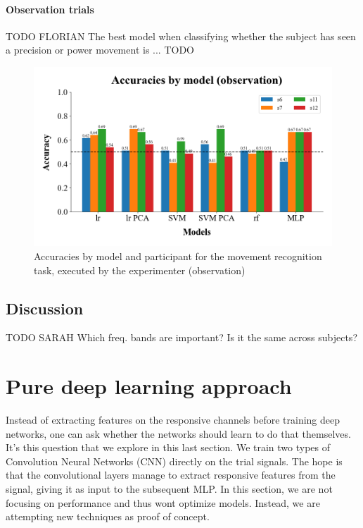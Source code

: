 \documentclass[10pt,conference,compsocconf]{IEEEtran}
\begin{document}
\paragraph{Observation trials}
TODO FLORIAN
The best model when classifying whether the subject has seen a precision or power movement is ... TODO

\begin{figure}[h!]
  \center
  \includegraphics[width=\linewidth]{../figures/accuracies_across_part_obs.png}
  \caption{Accuracies by model and participant for the movement recognition task, executed by the experimenter (observation)}
\end{figure}
\FloatBarrier

\subsection{Discussion}
TODO SARAH
Which freq. bands are important? Is it the same across subjects?

\section{Pure deep learning approach}
\label{sec:deeplearning}
Instead of extracting features on the responsive channels before training deep networks, one can ask whether the networks should learn to do that themselves. It's this question that we explore in this last section. We train two types of Convolution Neural Networks (CNN) directly on the trial signals. The hope is that the convolutional layers manage to extract responsive features from the signal, giving it as input to the subsequent MLP. In this section, we are not focusing on performance and thus wont optimize models. Instead, we are attempting new techniques as proof of concept.
\end{document}
